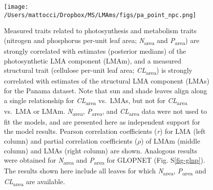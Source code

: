 \documentclass[
  12pt,
  a4paper,
,tablecaptionabove
]{scrartcl}
\begin{document}
\newpage

\begin{figure}

{\centering \texttt{[image: /Users/mattocci/Dropbox/MS/LMAms/figs/pa\_point\_npc.png]}

}

\caption{\label{fig-PA-NPC}Measured traits related to photosynthesis and
metabolism traits (nitrogen and phosphorus per-unit leaf area;
\emph{N}\textsubscript{area} and \emph{P}\textsubscript{area}) are
strongly correlated with estimates (posterior medians) of the
photosynthetic LMA component (LMAm), and a measured structural trait
(cellulose per-unit leaf area; \emph{CL}\textsubscript{area}) is
strongly correlated with estimates of the structural LMA component
(LMAs) for the Panama dataset. Note that sun and shade leaves align
along a single relationship for \emph{CL}\textsubscript{area} vs.~LMAs,
but not for \emph{CL}\textsubscript{area} vs.~LMA or LMAm.
\emph{N}\textsubscript{area}, \emph{P}\textsubscript{area}, and
\emph{CL}\textsubscript{area} data were not used to fit the models, and
are presented here as independent support for the model results. Pearson
correlation coefficients (\emph{r}) for LMA (left column) and partial
correlation coefficients (\(\rho\)) of LMAm (middle column) and LMAs
(right column) are shown. Analogous results were obtained for
\emph{N}\textsubscript{area} and \emph{P}\textsubscript{area} for
GLOPNET (Fig. S\ref{fig-glnp}). The results shown here include all
leaves for which \emph{N}\textsubscript{area},
\emph{P}\textsubscript{area} and \emph{CL}\textsubscript{area} are
available.}

\end{figure}
\end{document}
